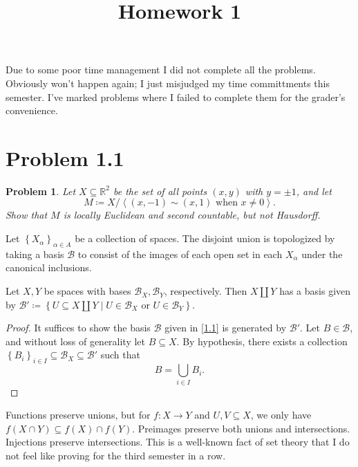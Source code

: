 \documentclass[11pt, letterpaper]{article}
\title{Homework 1}
\theoremstyle{theorem}
\newtheorem{problem}{Problem}
\begin{document}
\makeproblem

\begin{center}
	Due to some poor time management I did not complete all the problems. Obviously won't happen again; I just misjudged my time committments this semester. I've marked problems where I failed to complete them for the grader's convenience.
\end{center}


\section{Problem 1.1}
\begin{problem}\label{1}
	Let $X\subseteq \mathbb{R} ^2$ be the set of all points $(x,y)$ with $y=\pm 1$, and let
	\[
		M\coloneqq X / \left\langle (x,-1)\sim (x,1) \text{ when } x\neq 0 \right\rangle 
	.\]
	Show that $M$ is locally Euclidean and second countable, but not Hausdorff.
\end{problem}

\begin{definition}[Lee A.1.3]\label{1.1}
	Let $\left\{ X_\alpha  \right\}_{\alpha \in A} $ be a collection of spaces. The disjoint union is topologized by taking a basis $\mathcal{B} $ to consist of the images of each open set in each $X_\alpha $ under the canonical inclusions.
\end{definition}


\begin{proposition}\label{1.2}
	Let $X,Y$ be spaces with bases $\mathcal{B} _X,\mathcal{B} _Y$, respectively. Then $X\amalg Y$ has a basis given by $\mathcal{B}'\coloneqq \left\{ U\subseteq X\amalg Y\mid U\in \mathcal{B} _X \text{ or } U\in \mathcal{B} _Y \right\} $.
\end{proposition}
\begin{proof}
	It suffices to show the basis $\mathcal{B} $ given in \cref{1.1} is generated by $\mathcal{B}'$. Let $B\in \mathcal{B} $, and without loss of generality let $B\subseteq X$. By hypothesis, there exists a collection $\left\{ B_i \right\}_{i\in I} \subseteq \mathcal{B} _X\subseteq \mathcal{B} '$ such that
	\[
		B = \bigcup_{i\in I} B_i
	.\]
\end{proof}

\begin{remark}\label{1.3}
	Functions preserve unions, but for $f : X \to Y$ and $U,V\subseteq X$, we only have $f(X \cap Y)\subseteq f(X)\cap f(Y)$. Preimages preserve both unions and intersections. Injections preserve intersections. This is a well-known fact of set theory that I do not feel like proving for the third semester in a row.
\end{remark}
\end{document}
